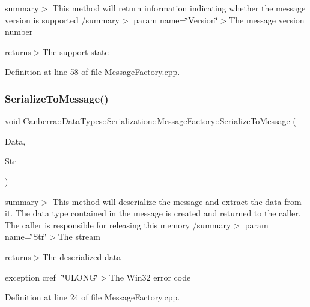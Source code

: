 summary$>$ This method will return information indicating whether the message version is supported /summary$>$ param name=\char`\"{}\+Version\char`\"{}$>$The message version number

returns$>$The support state

Definition at line 58 of file Message\+Factory.\+cpp.

\mbox{\label{class_canberra_1_1_data_types_1_1_serialization_1_1_message_factory_a04dda305fdbf7bb5345967f0529e6387_a04dda305fdbf7bb5345967f0529e6387}} 
\subsubsection{\texorpdfstring{Serialize\+To\+Message()}{SerializeToMessage()}}
{\footnotesize\ttfamily void Canberra\+::\+Data\+Types\+::\+Serialization\+::\+Message\+Factory\+::\+Serialize\+To\+Message (\begin{DoxyParamCaption}\item[{\hyperlink{class_canberra_1_1_serialization_1_1_serializable_object}{Canberra\+::\+Serialization\+::\+Serializable\+Object} $\ast$}]{Data,  }\item[{\hyperlink{class_canberra_1_1_utility_1_1_core_1_1_byte_stream}{Canberra\+::\+Utility\+::\+Core\+::\+Byte\+Stream} \&}]{Str }\end{DoxyParamCaption})}

summary$>$ This method will deserialize the message and extract the data from it. The data type contained in the message is created and returned to the caller. The caller is responsible for releasing this memory /summary$>$ param name=\char`\"{}\+Str\char`\"{}$>$The stream

returns$>$The deserialized data

exception cref=\char`\"{}\+U\+L\+O\+N\+G\char`\"{}$>$The Win32 error code

Definition at line 24 of file Message\+Factory.\+cpp.

\mbox{\label{class_canberra_1_1_data_types_1_1_serialization_1_1_message_factory_a65f9fac8fd218160a684f52d72fadb94_a65f9fac8fd218160a684f52d72fadb94}} 
